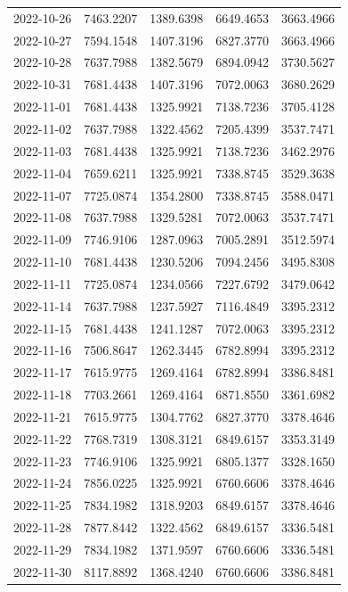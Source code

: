 {\begin{longtable}{lllll}
2022-10-26 & 7463.2207 & 1389.6398 & 6649.4653 & 3663.4966 \\
2022-10-27 & 7594.1548 & 1407.3196 & 6827.3770 & 3663.4966 \\
2022-10-28 & 7637.7988 & 1382.5679 & 6894.0942 & 3730.5627 \\
2022-10-31 & 7681.4438 & 1407.3196 & 7072.0063 & 3680.2629 \\
2022-11-01 & 7681.4438 & 1325.9921 & 7138.7236 & 3705.4128 \\
2022-11-02 & 7637.7988 & 1322.4562 & 7205.4399 & 3537.7471 \\
2022-11-03 & 7681.4438 & 1325.9921 & 7138.7236 & 3462.2976 \\
2022-11-04 & 7659.6211 & 1325.9921 & 7338.8745 & 3529.3638 \\
2022-11-07 & 7725.0874 & 1354.2800 & 7338.8745 & 3588.0471 \\
2022-11-08 & 7637.7988 & 1329.5281 & 7072.0063 & 3537.7471 \\
2022-11-09 & 7746.9106 & 1287.0963 & 7005.2891 & 3512.5974 \\
2022-11-10 & 7681.4438 & 1230.5206 & 7094.2456 & 3495.8308 \\
2022-11-11 & 7725.0874 & 1234.0566 & 7227.6792 & 3479.0642 \\
2022-11-14 & 7637.7988 & 1237.5927 & 7116.4849 & 3395.2312 \\
2022-11-15 & 7681.4438 & 1241.1287 & 7072.0063 & 3395.2312 \\
2022-11-16 & 7506.8647 & 1262.3445 & 6782.8994 & 3395.2312 \\
2022-11-17 & 7615.9775 & 1269.4164 & 6782.8994 & 3386.8481 \\
2022-11-18 & 7703.2661 & 1269.4164 & 6871.8550 & 3361.6982 \\
2022-11-21 & 7615.9775 & 1304.7762 & 6827.3770 & 3378.4646 \\
2022-11-22 & 7768.7319 & 1308.3121 & 6849.6157 & 3353.3149 \\
2022-11-23 & 7746.9106 & 1325.9921 & 6805.1377 & 3328.1650 \\
2022-11-24 & 7856.0225 & 1325.9921 & 6760.6606 & 3378.4646 \\
2022-11-25 & 7834.1982 & 1318.9203 & 6849.6157 & 3378.4646 \\
2022-11-28 & 7877.8442 & 1322.4562 & 6849.6157 & 3336.5481 \\
2022-11-29 & 7834.1982 & 1371.9597 & 6760.6606 & 3336.5481 \\
2022-11-30 & 8117.8892 & 1368.4240 & 6760.6606 & 3386.8481 \\

\end{longtable}}
